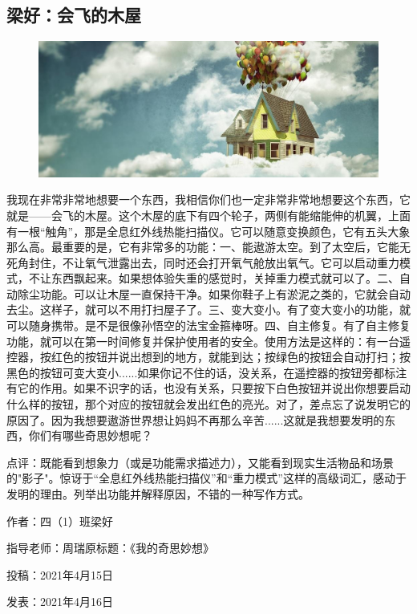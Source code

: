 \vspace{10pt}

{\centering\subsection*{梁好：会飞的木屋}}


\renewcommand{\leftmark}{梁好：会飞的木屋}

\begin{figure}[htbp]

\centering

\includegraphics[width = .5\textwidth]{./ch/40.jpg}

\end{figure}



我现在非常非常地想要一个东西，我相信你们也一定非常非常地想要这个东西，它就是——会飞的木屋。这个木屋的底下有四个轮子，两侧有能缩能伸的机翼，上面有一根“触角”，那是全息红外线热能扫描仪。它可以随意变换颜色，它有五头大象那么高。最重要的是，它有非常多的功能：一、能遨游太空。到了太空后，它能无死角封住，不让氧气泄露出去，同时还会打开氧气舱放出氧气。它可以启动重力模式，不让东西飘起来。如果想体验失重的感觉时，关掉重力模式就可以了。二、自动除尘功能。可以让木屋一直保持干净。如果你鞋子上有淤泥之类的，它就会自动去尘。这样子，就可以不用打扫屋子了。三、变大变小。有了变大变小的功能，就可以随身携带。是不是很像孙悟空的法宝金箍棒呀。四、自主修复。有了自主修复功能，就可以在第一时间修复并保护使用者的安全。使用方法是这样的：有一台遥控器，按红色的按钮并说出想到的地方，就能到达；按绿色的按钮会自动打扫；按黑色的按钮可变大变小......如果你记不住的话，没关系，在遥控器的按钮旁都标注有它的作用。如果不识字的话，也没有关系，只要按下白色按钮并说出你想要启动什么样的按钮，那个对应的按钮就会发出红色的亮光。对了，差点忘了说发明它的原因了。因为我想要遨游世界想让妈妈不再那么辛苦......这就是我想要发明的东西，你们有哪些奇思妙想呢？

点评：既能看到想象力（或是功能需求描述力），又能看到现实生活物品和场景的"影子"。惊讶于“全息红外线热能扫描仪”和“重力模式”这样的高级词汇，感动于发明的理由。列举出功能并解释原因，不错的一种写作方式。





\vspace{10pt}



作者：四（1）班梁好

指导老师：周瑞原标题：《我的奇思妙想》

投稿：2021年4月15日

发表：2021年4月16日


                



\vspace{10pt}

\hline



